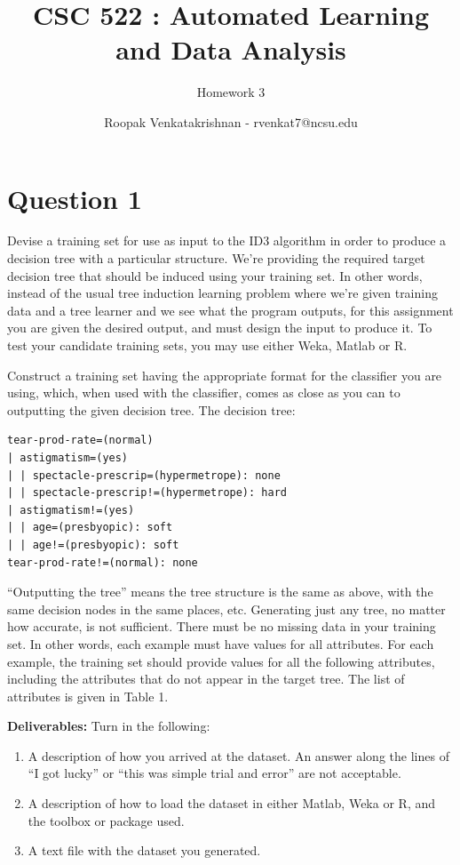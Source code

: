 \documentclass[fontsize=10pt]{scrartcl}
\begin{document}
	\title{CSC 522 : Automated Learning and Data Analysis}
	\subtitle{Homework 3}
	\author{Roopak Venkatakrishnan - rvenkat7@ncsu.edu}
	\maketitle

	\section{Question 1}
	Devise a training set for use as input to the ID3 algorithm in order to produce a decision tree with a particular structure. We’re providing the required target decision tree that should be induced using your training set. In other words, instead of the usual tree induction learning problem where we’re given training data and a tree learner and we see what the program outputs, for this assignment you are given the desired output, and must design the input to produce it. To test your candidate training sets, you may use either Weka, Matlab or R.

	Construct a training set having the appropriate format for the classifier you are using, which, when used with the classifier, comes as close as you can to outputting the given decision tree. The decision tree:
\begin{verbatim}
tear-prod-rate=(normal)
| astigmatism=(yes)
| | spectacle-prescrip=(hypermetrope): none
| | spectacle-prescrip!=(hypermetrope): hard
| astigmatism!=(yes)
| | age=(presbyopic): soft
| | age!=(presbyopic): soft
tear-prod-rate!=(normal): none

\end{verbatim}

	``Outputting the tree'' means the tree structure is the same as above, with the same decision nodes in the same places, etc. Generating just any tree, no matter how accurate, is not sufficient. There must be no missing data in your training set. In other words, each example must have values for all attributes. For each example, the training set should provide values for all the following attributes, including the attributes that do not appear in the target tree. The list of attributes is given in Table 1.

	\textbf{Deliverables:} Turn in the following:
	\begin{enumerate}
	\item
	A description of how you arrived at the dataset. An answer along the lines of “I got lucky” or “this was simple trial and error” are not acceptable.

	\item
	A description of how to load the dataset in either Matlab, Weka or R, and the toolbox or package used.

	\item
	A text file with the dataset you generated.
	\end{enumerate}
\end{document}
